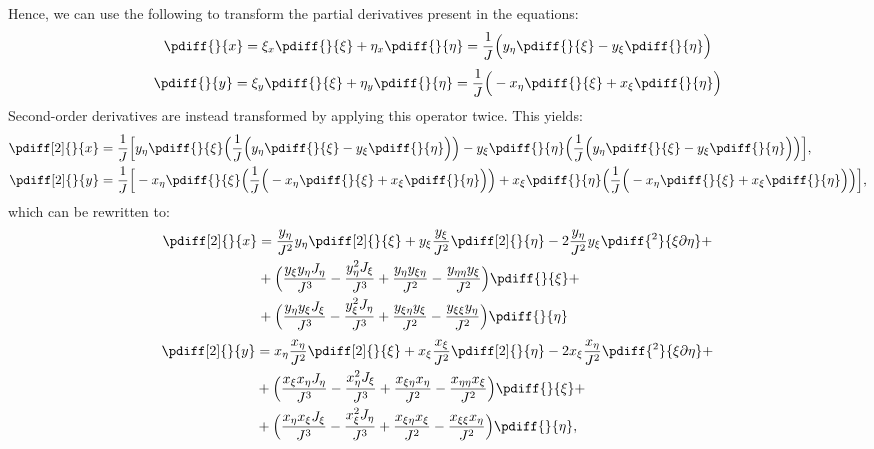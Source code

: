 Hence, we can use the following to transform the partial derivatives present in the equations:
	\begin{align}\label{trans}
		\pdiff{}{x}
		=\xi_x\pdiff{}{\xi}
		+ \eta_x\pdiff{}{\eta}
		=\frac{1}{J}\Big(y_{\eta} \pdiff{}{\xi}
		-y_{\xi}\pdiff{}{\eta}\Big)
	\end{align}
	\begin{align}
		\pdiff{}{y}
		=\xi_y\pdiff{}{\xi}
		+\eta_y \pdiff{}{\eta}
		=\frac{1}{J}\Big(-x_{\eta}\pdiff{}{\xi}
		+x_{\xi}\pdiff{}{\eta}
		\Big)
	\end{align}
%
Second-order derivatives are instead transformed by applying this operator twice.
This yields:
%
\begin{align}
	\pdiff[2]{}{x}
	&=\frac{1}{J}\Big[y_{\eta} \pdiff{}{\xi} \Big( \frac{1}{J}\Big(y_{\eta} \pdiff{}{\xi}
	-y_{\xi}\pdiff{}{\eta}\Big)\Big)
	-y_{\xi}\pdiff{}{\eta} \Big( \frac{1}{J}\Big(y_{\eta} \pdiff{}{\xi}
	-y_{\xi}\pdiff{}{\eta}\Big) \Big) \Big],
\\
\pdiff[2]{}{y}
		&=\frac{1}{J}\Big[-x_{\eta}\pdiff{}{\xi} \Big( \frac{1}{J}\Big(-x_{\eta}\pdiff{}{\xi}
		+x_{\xi}\pdiff{}{\eta}
		\Big)\Big)
		+x_{\xi}\pdiff{}{\eta} \Big(\frac{1}{J}\Big(-x_{\eta}\pdiff{}{\xi}
		+x_{\xi}\pdiff{}{\eta}
		\Big) \Big)
		\Big],
\end{align}
%
which can be rewritten to:
%
\begin{align}
	\begin{aligned}
		\pdiff[2]{}{x} & =
		\frac{y_{\eta}}{J^2} y_{\eta} \pdiff[2]{}{\xi}
		+ y_{\xi} \frac{y_{\xi}}{J^2} \pdiff[2]{}{\eta}
		- 2\frac{y_{\eta}}{J^2} y_{\xi}\pdiff{^2}{\xi \partial \eta} + \\
		& +  \Big(
		\frac{y_{\xi} y_{\eta}J_{\eta}}{J^3}
		- \frac{y_{\eta}^2 J_{\xi}}{J^3}
		+ \frac{y_{\eta}y_{\xi\eta}}{J^2}
		-  \frac{y_{\eta \eta} y_{\xi}}{J^2}
		\Big)\pdiff{}{\xi} +\\
		& + \Big(
		\frac{y_{\eta} y_{\xi} J_{\xi}}{J^3}
		- \frac{y_{\xi}^2 J_{\eta}}{J^3}
		+  \frac{y_{\xi \eta}y_{\xi}}{J^2}
		- \frac{ y_{\xi\xi} y_{\eta}}{J^2}
		\Big)\pdiff{}{\eta}
	\end{aligned}
\end{align}
\begin{align}
    \begin{aligned}
		\pdiff[2]{}{y} & =
	    x_{\eta}\frac{x_{\eta}}{J^2}\pdiff[2]{}{\xi}
		+ x_{\xi}\frac{x_{\xi}}{J^2}\pdiff[2]{}{\eta}
		- 2 x_{\xi}\frac{x_{\eta}}{J^2}\pdiff{^2}{\xi \partial\eta} + \\
		& + \Big(
		\frac{x_{\xi}x_{\eta}J_{\eta}}{J^3}
		-\frac{x_{\eta}^2J_{\xi}}{J^3}
		+ \frac{x_{\xi\eta} x_{\eta}}{J^2}
		- \frac{x_{\eta\eta}x_{\xi}}{J^2}
		\Big) \pdiff{}{\xi} + \\
		&+ \Big(
		\frac{x_{\eta}x_{\xi}J_{\xi}}{J^3}
		- \frac{ x_{\xi}^2J_{\eta}}{J^3}
		+ \frac{x_{\xi\eta}x_{\xi}}{J^2}
		- \frac{x_{\xi \xi}x_{\eta}}{J^2}
		\Big) \pdiff{}{\eta},
    \end{aligned}
\end{align}

